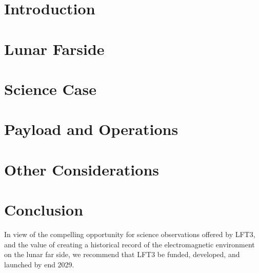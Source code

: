 \documentclass[preprint]{aastex631}
\begin{document}
\section{Introduction} 
\label{sec:intro}


\section{Lunar Farside}
\label{sec:Lunar Farside Location Conditions}


\section{Science Case}
\label{sec:science}


%

\section{Payload and Operations}
\label{sec:payload}


\section{Other Considerations}
\label{sec:otherconsiderations}



\section{Conclusion}

In view of the compelling opportunity for science observations offered by LFT3, and the value of creating a historical record of the electromagnetic environment on the lunar far side, we recommend that LFT3 be funded, developed, and launched by end 2029. 

{}

\end{document}
